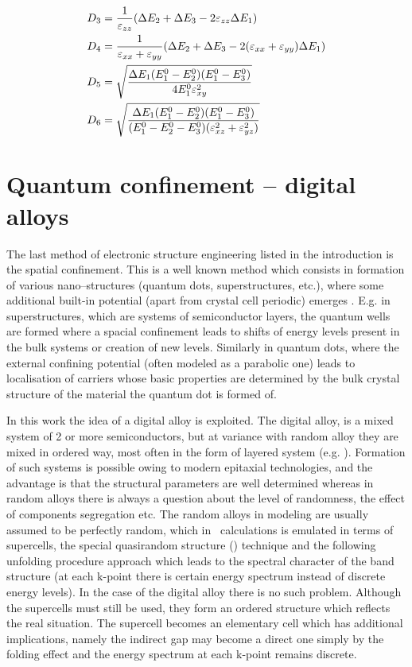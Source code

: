 \begin{enumerate}
\begin{align}
		D_3 &= \frac{1}{\varepsilon_{zz}}(\Delta E_2+\Delta E_3-2\varepsilon_{zz}\Delta E_1)\notag\\
		D_4 &= \frac{1}{\varepsilon_{xx}+\varepsilon_{yy}}(\Delta E_2+\Delta E_3-2(\varepsilon_{xx}+\varepsilon_{yy})\Delta E_1)\notag\\
		D_5 &= \sqrt{\frac{\Delta E_1(E_1^0-E_2^0)(E_1^0-E_3^0)}{4E_1^0\varepsilon_{xy}^2}}\notag\\
		D_6 &= \sqrt{\frac{\Delta E_1(E_1^0-E_2^0)(E_1^0-E_3^0)}{(E_1^0-E_2^0-E_3^0)(\varepsilon_{xz}^2+\varepsilon_{yz}^2)}}
	\end{align}
\end{enumerate}

\ornament
\section{Quantum confinement -- digital alloys}

The last method of electronic structure engineering listed in the introduction is the spatial confinement.
This is a well known method which consists in formation of various nano--structures (quantum dots, superstructures, etc.), where some additional built-in potential (apart from crystal cell periodic) emerges \cite{da_3-5,da1}.
E.g. in superstructures, which are systems of semiconductor layers, the quantum wells are formed where a spacial confinement leads to shifts of energy levels present in the bulk systems or creation of new levels.
Similarly in quantum dots, where the external confining potential (often modeled as a parabolic one) leads to localisation of carriers whose basic properties are determined by the bulk crystal structure of the material the quantum dot is formed of.

In this work the idea of a digital alloy is exploited.
The digital alloy, is a mixed system of 2 or more semiconductors, but at variance with random alloy they are mixed in ordered way, most often in the form of layered system (e.g. \cite{da_mbe}).
Formation of such systems is possible owing to modern epitaxial technologies, and the advantage is that the structural parameters are well determined whereas in random alloys there is always a question about the level of randomness, the effect of components segregation etc. The random alloys in modeling are usually assumed to be perfectly random, which in \abinitio\ calculations is emulated in terms of supercells,  the special quasirandom structure (\SQS) technique and the following unfolding procedure approach which leads to the spectral character of the band structure (at each k-point there is certain energy spectrum instead of discrete energy levels). In the case of the digital alloy there is no such problem. Although the supercells must still be used, they form an ordered structure which reflects the real situation. The supercell becomes an elementary cell which has additional implications, namely the indirect gap may become a direct one simply by the folding effect and the energy spectrum at each k-point remains discrete. 

